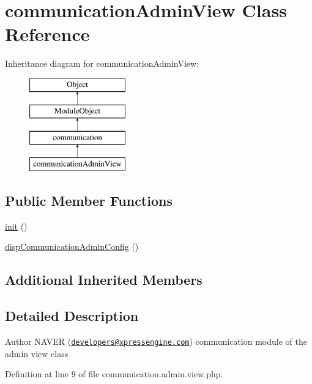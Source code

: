 \hypertarget{classcommunicationAdminView}{\section{communication\+Admin\+View Class Reference}
\label{classcommunicationAdminView}
}
Inheritance diagram for communication\+Admin\+View\+:\begin{figure}[H]
\begin{center}
\leavevmode
\includegraphics[height=4.000000cm]{classcommunicationAdminView}
\end{center}
\end{figure}
\subsection*{Public Member Functions}
\begin{DoxyCompactItemize}
\item 
\hyperlink{classcommunicationAdminView_a75c54eb9cc38929b399c2e5aa600c979}{init} ()
\item 
\hyperlink{classcommunicationAdminView_a622dd5ee36cad7a2c2e9d9eea814b0eb}{disp\+Communication\+Admin\+Config} ()
\end{DoxyCompactItemize}
\subsection*{Additional Inherited Members}


\subsection{Detailed Description}
\begin{DoxyAuthor}{Author}
N\+A\+V\+E\+R (\href{mailto:developers@xpressengine.com}{\tt developers@xpressengine.\+com}) communication module of the admin view class 
\end{DoxyAuthor}


Definition at line 9 of file communication.\+admin.\+view.\+php.



